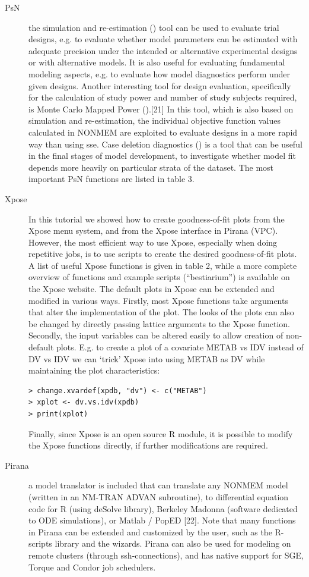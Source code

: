 \begin{description}
\item[PsN] the simulation and re-estimation () tool can be used to
  evaluate trial designs, e.g. to evaluate whether model parameters
  can be estimated with adequate precision under the intended or
  alternative experimental designs or with alternative models. It is
  also useful for evaluating fundamental modeling aspects, e.g. to
  evaluate how model diagnostics perform under given designs. Another
  interesting tool for design evaluation, specifically for the
  calculation of study power and number of study subjects required, is
  Monte Carlo Mapped Power ().[21] In this tool, which is also
  based on simulation and re-estimation, the individual objective
  function values calculated in NONMEM are exploited to evaluate
  designs in a more rapid way than using sse. Case deletion
  diagnostics () is a tool that can be useful in the final stages
  of model development, to investigate whether model fit depends more
  heavily on particular strata of the dataset. The most important PsN
  functions are listed in table 3.
\item[Xpose] In this tutorial we showed how to create goodness-of-fit
  plots from the Xpose menu system, and from the Xpose interface in
  Pirana (VPC). However, the most efficient way to use Xpose,
  especially when doing repetitive jobs, is to use scripts to create
  the desired goodness-of-fit plots. A list of useful Xpose functions
  is given in table 2, while a more complete overview of functions and
  example scripts (“bestiarium”) is available on the Xpose
  website. The default plots in Xpose can be extended and modified in
  various ways. Firstly, most Xpose functions take arguments that
  alter the implementation of the plot. The looks of the plots can
  also be changed by directly passing lattice arguments to the Xpose
  function. Secondly, the input variables can be altered easily to
  allow creation of non-default plots. E.g. to create a plot of a
  covariate METAB vs IDV instead of DV vs IDV we can ‘trick’ Xpose
  into using METAB as DV while maintaining the plot
  characteristics:
\begin{lstlisting}
> change.xvardef(xpdb, "dv") <- c("METAB")
> xplot <- dv.vs.idv(xpdb)
> print(xplot)
\end{lstlisting}

\noindent Finally, since Xpose is an open source R module, it is possible to
modify the Xpose functions directly, if further modifications are
required.

\item [Pirana] a model translator is included that can translate
any NONMEM model (written in an NM-TRAN ADVAN subroutine), to
differential equation code for R (using deSolve library), Berkeley
Madonna (software dedicated to ODE simulations), or Matlab / PopED
[22]. Note that many functions in Pirana can be extended and
customized by the user, such as the R-scripts library and the
wizards. Pirana can also be used for modeling on remote clusters
(through ssh-connections), and has native support for SGE, Torque and
Condor job schedulers.

\end{description}


